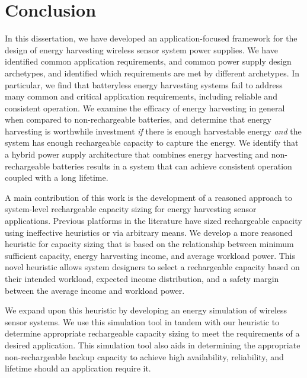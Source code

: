 \chapter{Conclusion}
\label{chap:conc}

In this dissertation, we have developed an application-focused framework for the design of energy harvesting wireless sensor system power supplies.
We have identified common application requirements, and common power supply design archetypes, and identified which requirements are met by different archetypes.
In particular, we find that batteryless energy harvesting systems fail to address many common and critical application requirements, including reliable and consistent operation.
We examine the efficacy of energy harvesting in general when compared to non-rechargeable batteries, and determine that energy harvesting is worthwhile investment \textit{if} there is enough harvestable energy \textit{and} the system has enough rechargeable capacity to capture the energy.
We identify that a hybrid power supply architecture that combines energy harvesting and non-rechargeable batteries results in a system that can achieve consistent operation coupled with a long lifetime.

A main contribution of this work is the development of a reasoned approach to system-level rechargeable capacity sizing for energy harvesting sensor applications.
Previous platforms in the literature have sized rechargeable capacity using ineffective heuristics or via arbitrary means.
We develop a more reasoned heuristic for capacity sizing that is based on the relationship between minimum sufficient capacity, energy harvesting income, and average workload power. 
This novel heuristic allows system designers to select a rechargeable capacity based on their intended workload, expected income distribution, and a safety margin between the average income and workload power.

We expand upon this heuristic by developing an energy simulation of wireless sensor systems.
We use this simulation tool in tandem with our heuristic to determine appropriate rechargeable capacity sizing to meet the requirements of a desired application. 
This simulation tool also aids in determining the appropriate non-rechargeable backup capacity to achieve high availability, reliability, and lifetime should an application require it.

